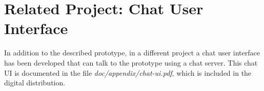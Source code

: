 \section{Related Project: Chat User Interface}
\label{chatui}
In addition to the described prototype, in a different
project a chat user interface has been
developed that can talk to the prototype using a chat server.
This chat UI is documented in the file \textit{doc/appendix/chat-ui.pdf},
which is included in the digital distribution.
